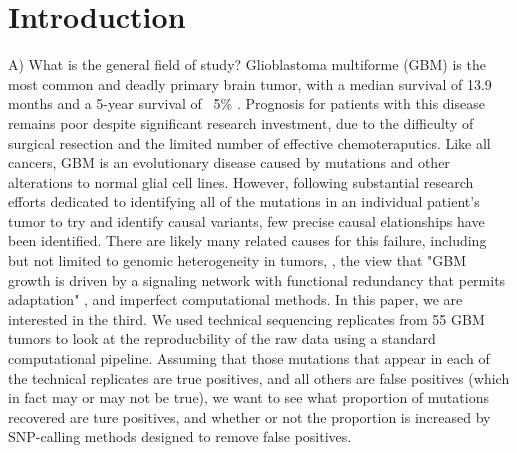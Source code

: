 \documentclass[11pt]{article} %
\begin{document}
\section{Introduction}

A) What is the general field of study?
Glioblastoma multiforme (GBM) is the most common and deadly primary brain tumor, with a median survival of 13.9 months and a 5-year survival of ~5\% \cite{TCGA-GBM-13}. Prognosis for patients with this disease remains poor despite significant research investment, due to the difficulty of surgical resection and the limited number of effective chemoteraputics. Like all cancers, GBM is an evolutionary disease caused by mutations and other alterations to normal glial cell lines. However, following substantial research efforts dedicated to identifying all of the mutations in an individual patient's tumor to try and identify causal variants, few precise causal elationships have been identified. There are likely many related causes for this failure, including but not limited to genomic heterogeneity in tumors, \cite{ValentineD}, the view that "GBM growth is driven by a signaling network with functional redundancy that permits adaptation" \cite{TCGA-GBM-13}, and imperfect computational methods. 
In this paper, we are interested in the third. We used technical sequencing replicates from 55 GBM tumors to look at the reproducbility of the raw data using a standard computational pipeline. Assuming that those mutations that appear in each of the technical replicates are true positives, and all others are false positives (which in fact may or may not be true), we want to see what proportion of mutations recovered are ture positives, and whether or not the proportion is increased by SNP-calling methods designed to remove false positives.
\end{document}
